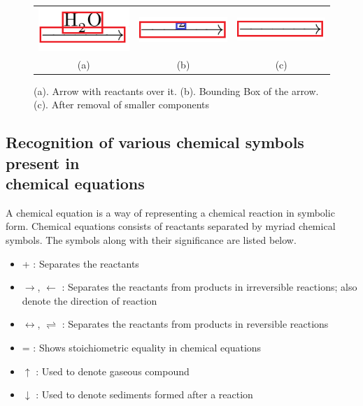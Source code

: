 \documentclass[conference]{IEEEtran}
\begin{document}
\begin{figure}[h]\center\footnotesize
\begin{tabular}{c  c c }
 \includegraphics[width=0.3\linewidth]{arrow_with_element.png}&  
 \includegraphics[width=0.3\linewidth]{segmentation_error.png}&  
 \includegraphics[width=0.28\linewidth]{segmentation_error_fixed.png} \\ 
(a)&(b)&(c)\\
 \end{tabular} 
 \caption{(a). Arrow with reactants over it. (b). Bounding Box of the arrow. (c). After removal of smaller components}
 \label{fig:arrow_error}
\end{figure}


\subsection{Recognition of various chemical symbols present in \\chemical equations} 
A chemical equation is a way of representing a chemical reaction in symbolic form.
Chemical equations consists of reactants separated by myriad chemical symbols. The symbols along with their significance are listed below. 

\begin{itemize}
\item
+ : Separates the reactants
\item
$\rightarrow$, $\leftarrow$ : Separates the reactants from products in irreversible reactions; also denote the direction of reaction
\item
$\leftrightarrow$, $\rightleftharpoons$ : Separates the reactants from products in reversible reactions
\item 
= : Shows stoichiometric equality in chemical equations
\item
$\uparrow$ : Used to denote gaseous compound
\item
$\downarrow$ : Used to denote sediments formed after a reaction
\end{itemize} 
\end{document}
